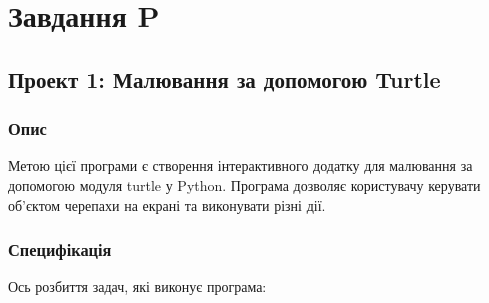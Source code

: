 \documentclass[12pt]{article}
\begin{document}
\newpage
\section{Завдання P}
\subsection{Проект 1: Малювання за допомогою Turtle}
\subsubsection{Опис}

Метою цієї програми є створення інтерактивного додатку для малювання за допомогою модуля turtle у Python. Програма дозволяє користувачу керувати об'єктом черепахи на екрані та виконувати різні дії.

\subsubsection{Специфікація}
Ось розбиття задач, які виконує програма:
\end{document}
